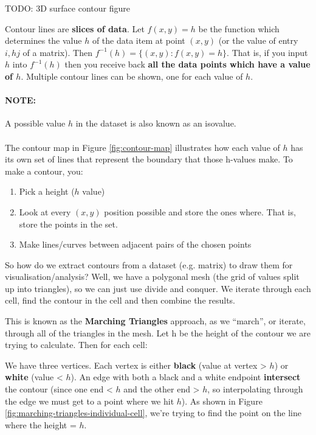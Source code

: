 \documentclass{article}
\begin{document}
TODO: 3D surface contour figure

Contour lines are \textbf{slices of data}. Let $f(x, y) = h$ be the function which determines the value $h$ of the data item at point $(x, y)$ (or the value of entry $i,hj$ of a matrix). Then $f^{-1}(h) = \lbrace (x, y) : f(x, y) = h \rbrace$. That is, if you input $h$ into $f^{-1}(h)$ then you receive back \textbf{all the data points which have a value of $h$}. Multiple contour lines can be shown, one for each value of $h$.

\paragraph{\textbf{NOTE: }} A possible value $h$ in the dataset is also known as an isovalue.
\paragraph{}

The contour map in Figure \ref{fig:contour-map} illustrates how each value of $h$ has its own set of lines that represent the boundary that those h-values make. To make a contour, you:
\begin{enumerate}
	\item Pick a height ($h$ value)
	\item Look at every $(x, y)$ position possible and store the ones where. That is, store the points in the set.
	\item Make lines/curves between adjacent pairs of the chosen points
\end{enumerate}

So how do we extract contours from a dataset (e.g. matrix) to draw them for visualisation/analysis? Well, we have a polygonal mesh (the grid of values split up into triangles), so we can just use divide and conquer. We iterate through each cell, find the contour in the cell and then combine the results.

This is known as the \textbf{Marching Triangles} approach, as we “march”, or iterate, through all of the triangles in the mesh. Let h be the height of the contour we are trying to calculate. Then for each cell:

We have three vertices. Each vertex is either \textbf{black} (value at vertex > $h$) or \textbf{white} (value < $h$). An edge with both a black and a white endpoint \textbf{intersect} the contour (since one end < $h$ and the other end > $h$, so interpolating through the edge we must get to a point where we hit $h$). As shown in Figure \ref{fig:marching-triangles-individual-cell}, we're trying to find the point on the line where the height = $h$.
\end{document}
